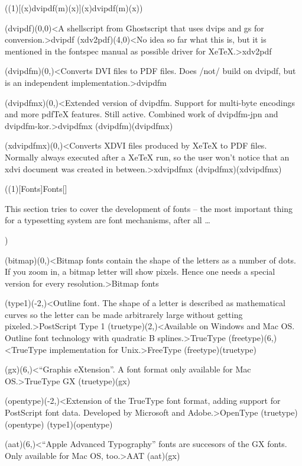 \tograph(\tostruct(1)[{(x)dvipdf(m)(x)}]{(x)dvipdf(m)(x)}){
	\tonode(dvipdf)(0,0)<A shellscript from Ghostscript that uses dvips and gs for conversion.>{dvipdf}
	\tonode(xdv2pdf)(4,0)<No idea so far what this is, but it is mentioned in the fontspec manual as possible driver for XeTeX.>{xdv2pdf}
	\steplayer

	\tonode(dvipdfm)(0,\layer)<Converts DVI files to PDF files. Does /not/ build on dvipdf, but is an independent implementation.>{dvipdfm}
	\steplayer

	\tonode(dvipdfmx)(0,\layer)<Extended version of dvipdfm. Support for multi-byte encodings and more pdfTeX features. Still active. Combined work of dvipdfm-jpn and dvipdfm-kor.>{dvipdfmx}
	\todraw(dvipdfm)(dvipdfmx)
	\steplayer

	\tonode(xdvipdfmx)(0,\layer)<Converts XDVI files produced by XeTeX to PDF files. Normally always executed after a XeTeX run, so the user won't notice that an xdvi document was created in between.>{xdvipdfmx}
	\todraw(dvipdfmx)(xdvipdfmx)
}

\tograph(\tostruct(1)[Fonts]{Fonts}[\fonttechnology]
\parbox{\textwidth}{\large
This section tries to cover the development of fonts – the most important thing for a typesetting system are font mechanisms, after all …\\[4ex]}
){
	\tonode(bitmap)(0,\layer)<Bitmap fonts contain the shape of the letters as a number of dots. If you zoom in, a bitmap letter will show pixels. Hence one needs a special version for every resolution.>{Bitmap fonts}
	\steplayer[-3]

	\tonode(type1)(-2,\layer)<Outline font. The shape of a letter is described as mathematical curves so the letter can be made arbitrarely large without getting pixeled.>{PostScript Type 1}
	\tonode(truetype)(2,\layer)<Available on Windows and Mac OS. Outline font technology with quadratic B splines.>{TrueType}
	\tonode(freetype)(6,\layer)<TrueType implementation for Unix.>{FreeType}
	\todraw(freetype)(truetype)
	\steplayer[-3]

	\tonode(gx)(6,\layer)<“Graphis eXtension”. A font format only available for Mac OS.>{TrueType GX}
	\todraw(truetype)(gx)
	\steplayer[-3]

	\tonode(opentype)(-2,\layer)<Extension of the TrueType font format, adding support for PostScript font data. Developed by Microsoft and Adobe.>{OpenType}
	\todraw(truetype)(opentype)
	\todraw(type1)(opentype)

	\tonode(aat)(6,\layer)<“Apple Advanced Typography” fonts are succesors of the GX fonts. Only available for Mac OS, too.>{AAT}
	\todraw(aat)(gx)
}

